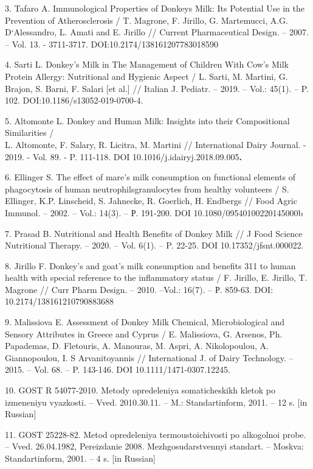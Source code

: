 3. Tafaro A. Immunological Properties of Donkeys Milk: Its Potential Use
in the Prevention of Atherosclerosis / T. Magrone, F. Jirillo, G.
Martemucci, A.G. D`Alessandro, L. Amati and E. Jirillo // Current
Pharmaceutical Design. -- 2007. -- Vol. 13. - 3711-3717.
DOI:10.2174/138161207783018590

4. Sarti L. Donkey's Milk in The Management of Children With Cow's Milk
Protein Allergy: Nutritional and Hygienic Aspect / L. Sarti, M. Martini,
G. Brajon, S. Barni, F. Salari {[}et al.{]} // Italian J. Pediatr. --
2019. -- Vol.: 45(1). -- P. 102. DOI:10.1186/s13052-019-0700-4.

5. Altomonte L. Donkey and Human Milk: Insights into their Compositional
Similarities /\\
L. Altomonte, F. Salary, R. Licitra, M. Martini // International Dairy
Journal. - 2019. - Vol. 89. - P. 111-118. DOI
10.1016/j.idairyj.2018.09.005{\bfseries .}

6. Ellinger S. The effect of mare's milk consumption on functional
elements of phagocytosis of human neutrophilsgranulocytes from healthy
volunteers / S. Ellinger, K.P. Linscheid, S. Jahnecke, R. Goerlich, H.
Endbergs // Food Agric Immunol. -- 2002. -- Vol.: 14(3). -- Р. 191-200.
DOI 10.1080/09540100220145000b

7. Prasad B. Nutritional and Health Benefits of Donkey Milk // J Food
Science Nutritional Therapy. -- 2020. -- Vol. 6(1). -- P. 22-25. DOI
10.17352/jfsnt.000022.

8. Jirillo F. Donkey's and goat's milk consumption and benefits 311 to
human health with special reference to the inflammatory status / F.
Jirillo, E. Jirillo, T. Magrone // Curr Pharm Design. -- 2010. --Vol.:
16(7). -- Р. 859-63. DOI: 10.2174/138161210790883688

9. Malissiova E. Assessment of Donkey Milk Chemical, Microbiological and
Sensory Attributes in Greece and Cyprus / E. Malissiova, G. Arsenos, Ph.
Papademas, D. Fletouris, A. Manouras, M. Aspri, A. Nikolopoulou, A.
Giannopoulou, I. S Arvanitoyannis // International J. of Dairy
Technology. -- 2015. -- Vol. 68. -- P. 143-146. DOI
10.1111/1471-0307.12245.

10. GOST R 54077-2010. Metody opredeleniya somaticheskikh kletok po
izmeneniyu vyazkosti. -- Vved. 2010.30.11. -- M.: Standartinform, 2011.
-- 12 s. {[}in Russian{]}

11. GOST 25228-82. Metod opredeleniya termoustoichivosti po
alkogol\textquotesingle noi probe. -- Vved. 26.04.1982, Pereizdanie
2008. Mezhgosudarstvennyi standart. -- Moskva: Standartinform, 2001. --
4 s. {[}in Russian{]}


